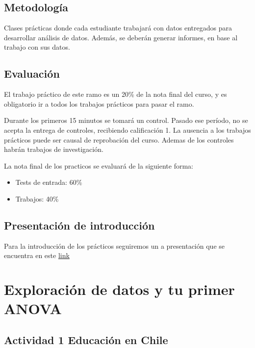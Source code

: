 \documentclass[]{book}
\providecommand{\tightlist}{%
  \setlength{\itemsep}{0pt}\setlength{\parskip}{0pt}}
\begin{document}
\section{Metodología}\label{metodologia}

Clases prácticas donde cada estudiante trabajará con datos entregados
para desarrollar análisis de datos. Además, se deberán generar informes,
en base al trabajo con sus datos.

\section{Evaluación}\label{evaluacion}

El trabajo práctico de este ramo es un 20\% de la nota final del curso,
y es obligatorio ir a todos los trabajos prácticos para pasar el ramo.

Durante los primeros 15 minutos se tomará un control. Pasado ese
período, no se acepta la entrega de controles, recibiendo calificación
1. La ausencia a los trabajos prácticos puede ser causal de reprobación
del curso. Ademas de los controles habrán trabajos de investigación.

La nota final de los practicos se evaluará de la siguiente forma:

\begin{itemize}
\tightlist
\item
  Tests de entrada: 60\%
\item
  Trabajos: 40\%
\end{itemize}

\section{Presentación de
introducción}\label{presentacion-de-introduccion}

Para la introducción de los prácticos seguiremos un a presentación que
se encuentra en este
\href{http://www.derek-corcoran-barrios.com/AyudantiaStatsPres/Clase1/Clase1.html}{link}

\chapter{Exploración de datos y tu primer ANOVA}\label{Explorando}

\section{Actividad 1 Educación en
Chile}\label{actividad-1-educacion-en-chile}
\end{document}
